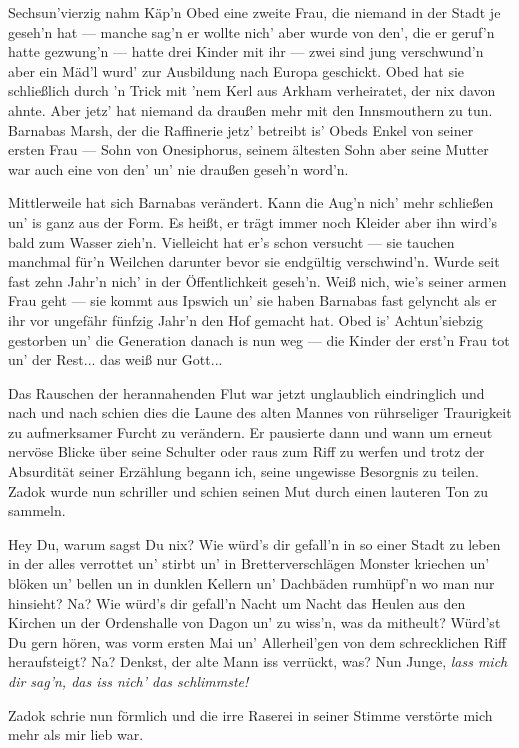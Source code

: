 Sechsun'vierzig nahm Käp'n Obed eine zweite Frau, die niemand in der Stadt je geseh'n hat --- manche sag'n er wollte nich' aber wurde von den', die er geruf'n hatte gezwung'n --- hatte drei Kinder mit ihr --- zwei sind jung verschwund'n aber ein Mäd'l wurd' zur Ausbildung nach Europa geschickt. Obed hat sie schließlich durch 'n Trick mit 'nem Kerl aus Arkham verheiratet, der nix davon ahnte. Aber jetz' hat niemand da draußen mehr mit den Innsmouthern zu tun. Barnabas Marsh, der die Raffinerie jetz' betreibt is' Obeds Enkel von seiner ersten Frau --- Sohn von Onesiphorus, seinem ältesten Sohn aber seine Mutter war auch eine von den' un' nie draußen geseh'n word'n.

Mittlerweile hat sich Barnabas verändert. Kann die Aug'n nich' mehr schließen un' is ganz aus der Form. Es heißt, er trägt immer noch Kleider aber ihn wird's bald zum Wasser zieh'n. Vielleicht hat er's schon versucht --- sie tauchen manchmal für'n Weilchen darunter bevor sie endgültig verschwind'n. Wurde seit fast zehn Jahr'n nich' in der Öffentlichkeit geseh'n. Weiß nich, wie's seiner armen Frau geht --- sie kommt aus Ipswich un' sie haben Barnabas fast gelyncht als er ihr vor ungefähr fünfzig Jahr'n den Hof gemacht hat. Obed is' Achtun'siebzig gestorben un' die Generation danach is nun weg --- die Kinder der erst'n Frau tot un' der Rest... das weiß nur Gott...
\grqq

 Das Rauschen der herannahenden Flut war jetzt unglaublich eindringlich und nach und nach schien dies die Laune des alten Mannes von rührseliger Traurigkeit zu aufmerksamer Furcht zu verändern. Er pausierte dann und wann um erneut nervöse Blicke über seine Schulter oder raus zum Riff zu werfen und trotz der Absurdität seiner Erzählung begann ich, seine ungewisse Besorgnis zu teilen. Zadok wurde nun schriller und schien seinen Mut durch einen lauteren Ton zu sammeln.

\glqq Hey Du, warum sagst Du nix? Wie würd's dir gefall'n in so einer Stadt zu leben in der alles verrottet un' stirbt un' in Bretterverschlägen Monster kriechen un' blöken un' bellen un in dunklen Kellern un' Dachbäden rumhüpf'n wo man nur hinsieht? Na? Wie würd's dir gefall'n Nacht um Nacht das Heulen aus den Kirchen un der Ordenshalle von Dagon un' zu wiss'n, was da mitheult? Würd'st Du gern hören, was vorm ersten Mai un' Allerheil'gen von dem schrecklichen Riff heraufsteigt? Na? Denkst, der alte Mann iss verrückt, was? Nun Junge, \textit{lass mich dir sag'n, das iss nich' das schlimmste!}\grqq

Zadok schrie nun förmlich und die irre Raserei in seiner Stimme verstörte mich mehr als mir lieb war.

